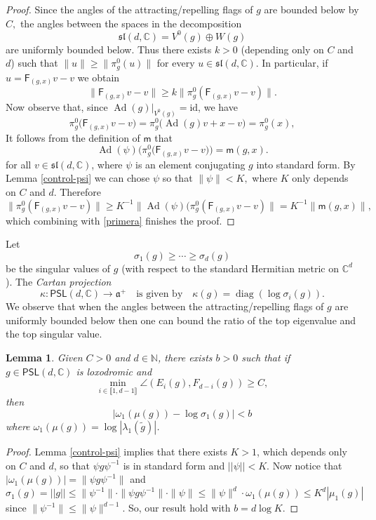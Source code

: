 \documentclass{amsart}
\theoremstyle{plain}
\newtheorem{lemma}[proposition]{Lemma}
\theoremstyle{definition}
\theoremstyle{remark}
\newcommand{\Ad}{\operatorname{Ad}}
\newcommand{\PSL}{\mathsf{PSL}}
\newcommand{\aff}[1]{\sf{F}_{#1}}
\renewcommand{\sf}[1]{{\mathsf{#1}}}
\newcommand{\lb}{\llbracket}
\newcommand{\rb}{\rrbracket}
\newcommand{\C}{\mathbb C}
\renewcommand{\sl}{\mathfrak{sl}}
\newcommand{\diag}{{\operatorname{diag}}}
\newcommand{\<}{\left <}
\renewcommand{\>}{\right >}
\renewcommand{\C}{\mathbb C}
\begin{document}
\begin{proof} Since the angles of the attracting/repelling flags of $g$ are bounded below by $C,$ the angles between the spaces in the decomposition 
$$\sl(d,\C)=V^0(g)\oplus W(g)$$ 
are uniformly bounded below. Thus there exists $k>0$ (depending only on $C$ and $d$) such that $\|u\|\geq \|\pi^0_g(u)\|$
for every $u\in\sl(d,\C)$.
In particular, if  $u=\aff{(g,x)}v-v$ we obtain
\begin{equation}
\label{primera}
\|\aff{(g,x)} v-v\|\geq k\big\|\pi^0_g(\aff{(g,x)}v-v)\big\|.
\end{equation} 
Now observe that, since $\Ad(g)|_{V^0(g)}=\mathrm{id}$, we have
 $$\pi^0_g\big(\aff{(g,x)}v-v\big)=\pi^0_g\big(\Ad(g)v+x-v)= \pi^0_g(x),$$ 
It follows from the  definition of $\sf m$ that $$\Ad(\psi)\big(\pi^0_g\big(\aff{(g,x)}v-v)\big)=\sf m(g,x).$$
for all $v\in\sl(d,\C)$, where $\psi$ is an element conjugating $g$ into standard form.
By Lemma  \ref{control-psi} we can chose $\psi$ so that $\|\psi\|<K,$ where $K$ only depends on $C$ and $d$.
Therefore
$$\|\pi^0_g(\aff{(g,x)}v-v)\|\geq K^{-1}\big\|\Ad(\psi)(\pi^0_g(\aff{(g,x)}v-v)\big\|=K^{-1}\|\sf m(g,x)\|,$$ which combining with \eqref{primera} finishes the proof.
\end{proof}

Let $$\sigma_1(g)\geq\cdots\geq\sigma_d(g)$$ be the singular values of $g$ (with respect to the standard Hermitian metric on $\mathbb C^d$).
The \emph{Cartan projection} 
$$\kappa:\PSL(d,\C)\to \mathfrak a^+\quad\text{is given by}\quad  \kappa(g)=\diag(\log \sigma_i(g)).$$
We observe that when the angles between the attracting/repelling flags of $g$ are uniformly bounded below then one can bound the
ratio of the top eigenvalue and the top singular value.

\begin{lemma}
\label{eigandsing}  
Given $C>0$  and $d\in \mathbb N$,  there exists $b>0$ such that if $g\in\PSL(d,\C)$ is loxodromic
and 
$$\min_{i\in\lb1,d-1\rb}\angle(E_i(g),F_{d-i}(g))\ge C,$$
then 
$$\big| \omega_1(\mu(g))-\log\sigma_1(g)\big|<b$$
where $\omega_1(\mu(g))=\log |\lambda_1(\tilde g)|$.
\end{lemma}

\begin{proof}
Lemma \ref{control-psi} implies that there exists $K>1$, which depends only on $C$ and $d$, so that
$\psi g\psi^{-1}$ is in standard form and $||\psi||<K$. Now notice that $|\omega_1(\mu(g))|=\|\psi g\psi^{-1}\|$
and 
$$\sigma_1(g)=||g||\le \|\psi^{-1}\| \cdot \|\psi g\psi^{-1}\|\cdot \|\psi\| \le \|\psi\|^d \cdot \omega_1(\mu(g)) \le K^d |\mu_1(g)|$$
since $\|\psi^{-1}\|\le\|\psi\|^{d-1}$. So, our result hold with $b=d\log K$.
\end{proof}
\end{document}
